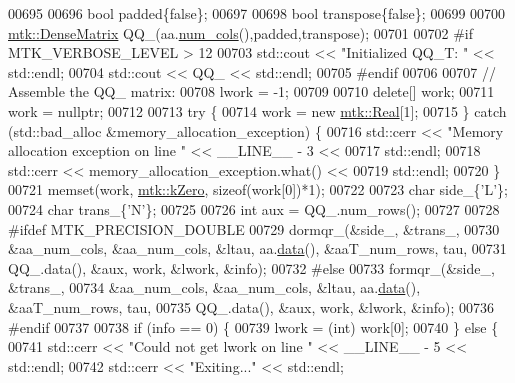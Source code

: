 \begin{DoxyCode}
00695 
00696   \textcolor{keywordtype}{bool} padded\{\textcolor{keyword}{false}\};
00697 
00698   \textcolor{keywordtype}{bool} transpose\{\textcolor{keyword}{false}\};
00699 
00700   \hyperlink{classmtk_1_1DenseMatrix}{mtk::DenseMatrix} QQ\_(aa.\hyperlink{classmtk_1_1DenseMatrix_a41747502d468c6728a4be31501b16e0e}{num\_cols}(),padded,transpose);
00701 
00702 \textcolor{preprocessor}{  #if MTK\_VERBOSE\_LEVEL > 12}
00703   std::cout << \textcolor{stringliteral}{"Initialized QQ\_T: "} << std::endl;
00704   std::cout << QQ\_ << std::endl;
00705 \textcolor{preprocessor}{  #endif}
00706 
00707   \textcolor{comment}{// Assemble the QQ\_ matrix:}
00708   lwork = -1;
00709 
00710   \textcolor{keyword}{delete}[] work;
00711   work = \textcolor{keyword}{nullptr};
00712 
00713   \textcolor{keywordflow}{try} \{
00714     work = \textcolor{keyword}{new} \hyperlink{group__c01-roots_gac080bbbf5cbb5502c9f00405f894857d}{mtk::Real}[1];
00715   \} \textcolor{keywordflow}{catch} (std::bad\_alloc &memory\_allocation\_exception) \{
00716     std::cerr << \textcolor{stringliteral}{"Memory allocation exception on line "} << \_\_LINE\_\_ - 3 <<
00717       std::endl;
00718     std::cerr << memory\_allocation\_exception.what() <<
00719       std::endl;
00720   \}
00721   memset(work, \hyperlink{group__c01-roots_ga59a451a5fae30d59649bcda274fea271}{mtk::kZero}, \textcolor{keyword}{sizeof}(work[0])*1);
00722 
00723   \textcolor{keywordtype}{char} side\_\{\textcolor{charliteral}{'L'}\};
00724   \textcolor{keywordtype}{char} trans\_\{\textcolor{charliteral}{'N'}\};
00725 
00726   \textcolor{keywordtype}{int} aux = QQ\_.num\_rows();
00727 
00728 \textcolor{preprocessor}{  #ifdef MTK\_PRECISION\_DOUBLE}
00729   dormqr\_(&side\_, &trans\_,
00730           &aa\_num\_cols, &aa\_num\_cols, &ltau, aa.\hyperlink{classmtk_1_1DenseMatrix_a0c33b8a9e01d157c61ddbdf807c25d84}{data}(), &aaT\_num\_rows, tau,
00731           QQ\_.data(), &aux, work, &lwork, &info);
00732 \textcolor{preprocessor}{  #else}
00733   formqr\_(&side\_, &trans\_,
00734           &aa\_num\_cols, &aa\_num\_cols, &ltau, aa.\hyperlink{classmtk_1_1DenseMatrix_a0c33b8a9e01d157c61ddbdf807c25d84}{data}(), &aaT\_num\_rows, tau,
00735           QQ\_.data(), &aux, work, &lwork, &info);
00736 \textcolor{preprocessor}{  #endif}
00737 
00738   \textcolor{keywordflow}{if} (info == 0) \{
00739     lwork = (int) work[0];
00740   \} \textcolor{keywordflow}{else} \{
00741     std::cerr << \textcolor{stringliteral}{"Could not get lwork on line "} << \_\_LINE\_\_ - 5 << std::endl;
00742     std::cerr << \textcolor{stringliteral}{"Exiting..."} << std::endl;

\end{DoxyCode}
